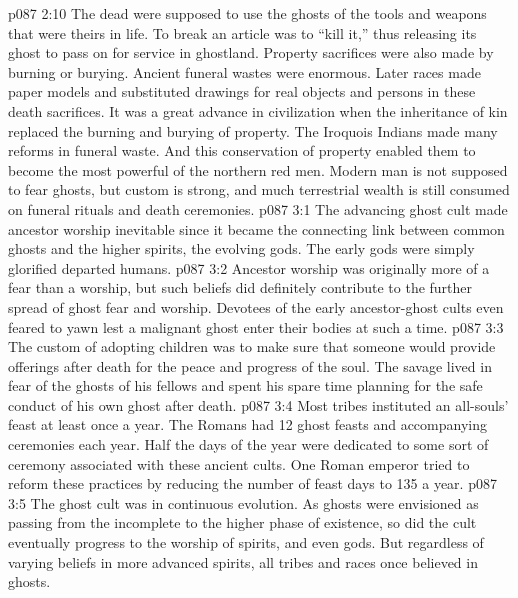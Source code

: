 \vs p087 2:10 The dead were supposed to use the ghosts of the tools and weapons that were theirs in life. To break an article was to “kill it,” thus releasing its ghost to pass on for service in ghostland. Property sacrifices were also made by burning or burying. Ancient funeral wastes were enormous. Later races made paper models and substituted drawings for real objects and persons in these death sacrifices. It was a great advance in civilization when the inheritance of kin replaced the burning and burying of property. The Iroquois Indians made many reforms in funeral waste. And this conservation of property enabled them to become the most powerful of the northern red men. Modern man is not supposed to fear ghosts, but custom is strong, and much terrestrial wealth is still consumed on funeral rituals and death ceremonies.
\vs p087 3:1 The advancing ghost cult made ancestor worship inevitable since it became the connecting link between common ghosts and the higher spirits, the evolving gods. The early gods were simply glorified departed humans.
\vs p087 3:2 Ancestor worship was originally more of a fear than a worship, but such beliefs did definitely contribute to the further spread of ghost fear and worship. Devotees of the early ancestor\hyp{}ghost cults even feared to yawn lest a malignant ghost enter their bodies at such a time.
\vs p087 3:3 The custom of adopting children was to make sure that someone would provide offerings after death for the peace and progress of the soul. The savage lived in fear of the ghosts of his fellows and spent his spare time planning for the safe conduct of his own ghost after death.
\vs p087 3:4 Most tribes instituted an all\hyp{}souls’ feast at least once a year. The Romans had 12 ghost feasts and accompanying ceremonies each year. Half the days of the year were dedicated to some sort of ceremony associated with these ancient cults. One Roman emperor tried to reform these practices by reducing the number of feast days to 135 a year.
\vs p087 3:5 \pc The ghost cult was in continuous evolution. As ghosts were envisioned as passing from the incomplete to the higher phase of existence, so did the cult eventually progress to the worship of spirits, and even gods. But regardless of varying beliefs in more advanced spirits, all tribes and races once believed in ghosts.
